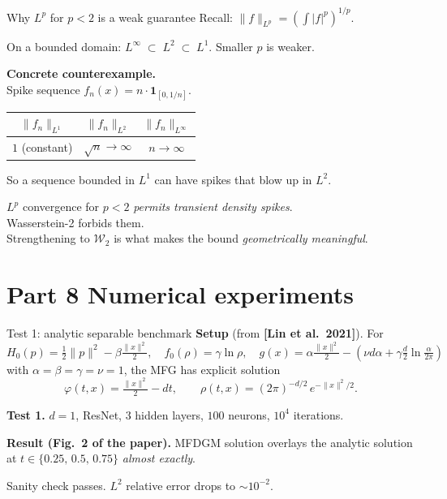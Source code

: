\documentclass[10pt,aspectratio=169]{beamer}
\newcommand{\W}{\mathcal{W}}
\newcommand{\teal}[1]{\textcolor{kaustteal}{#1}}
\newcommand{\citehl}[1]{\textcolor{kaustblue!80!black}{\textbf{[#1]}}}
\begin{document}
\begin{frame}{Why $L^p$ for $p<2$ is a weak guarantee}
Recall: $\|f\|_{L^p}=(\int |f|^p)^{1/p}$.

\medskip
On a bounded domain:
\(
  L^\infty \;\subset\; L^2 \;\subset\; L^1.
\)
Smaller $p$ is \alert{weaker}.

\medskip
\textbf{Concrete counterexample.}\\
Spike sequence $f_n(x) = n\cdot\mathbf{1}_{[0,1/n]}$.

\smallskip
\begin{center}
\begin{tabular}{ccc}
\toprule
$\|f_n\|_{L^1}$ & $\|f_n\|_{L^2}$ & $\|f_n\|_{L^\infty}$ \\
\midrule
$1$ (constant) & $\sqrt{n}\to\infty$ & $n\to\infty$ \\
\bottomrule
\end{tabular}
\end{center}

\medskip
So a sequence bounded in $L^1$ can have spikes that blow up in $L^2$.

\medskip
\begin{idea}[title=Implication for MFDGM]
$L^p$ convergence for $p<2$ \emph{permits transient density spikes}.\\
Wasserstein-2 forbids them.\\
Strengthening to $\W_2$ is what makes the bound \emph{geometrically meaningful}.
\end{idea}
\end{frame}

\section{Part 8 \;\textbar\; Numerical experiments}

\begin{frame}{Test 1: analytic separable benchmark}
\textbf{Setup} (from \citehl{Lin et al.\ 2021}). For
\[
  H_0(p) = \tfrac12\|p\|^2 - \beta\tfrac{\|x\|^2}{2}, \quad
  f_0(\rho)=\gamma\ln\rho, \quad
  g(x) = \alpha\tfrac{\|x\|^2}{2} - (\nu d\alpha + \gamma\tfrac{d}{2}\ln\tfrac{\alpha}{2\pi})
\]
with $\alpha=\beta=\gamma=\nu=1$, the MFG has explicit solution
\[
  \varphi(t,x) = \tfrac{\|x\|^2}{2} - dt,\qquad
  \rho(t,x) = (2\pi)^{-d/2}\,e^{-\|x\|^2/2}.
\]

\medskip
\textbf{Test 1.}  $d=1$, ResNet, $3$ hidden layers, $100$ neurons,
$10^4$ iterations.

\medskip
\textbf{Result (Fig.\ 2 of the paper).}  MFDGM solution overlays the
analytic solution at $t \in \{0.25,\,0.5,\,0.75\}$ \emph{almost exactly}.

\medskip
\teal{Sanity check passes.}  $L^2$ relative error drops to $\sim 10^{-2}$.
\end{frame}
\end{document}
